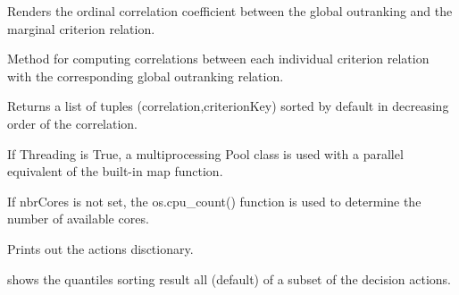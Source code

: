\documentclass[letterpaper,10pt,english]{sphinxmanual}
\begin{document}
\begin{fulllineitems}
\begin{fulllineitems}
\label{techDoc:bigOutrankingDigraphs.BigOutrankingDigraph.computeCriterion2RankingCorrelation}
Renders the ordinal correlation coefficient between
the global outranking and the marginal criterion relation.

\end{fulllineitems}


\begin{fulllineitems}
\label{techDoc:bigOutrankingDigraphs.BigOutrankingDigraph.computeMarginalVersusGlobalOutrankingCorrelations}
Method for computing correlations between each individual criterion relation with the corresponding
global outranking relation.

Returns a list of tuples (correlation,criterionKey) sorted by default in decreasing order of the correlation.

If Threading is True, a multiprocessing Pool class is used with a parallel equivalent of the built-in map function.

If nbrCores is not set, the os.cpu\_count() function is used to determine the number of
available cores.

\end{fulllineitems}


\begin{fulllineitems}
\label{techDoc:bigOutrankingDigraphs.BigOutrankingDigraph.showActions}
Prints out the actions disctionary.

\end{fulllineitems}


\begin{fulllineitems}
\label{techDoc:bigOutrankingDigraphs.BigOutrankingDigraph.showActionsSortingResult}
shows the quantiles sorting result all (default) of a subset of the decision actions.


\end{fulllineitems}
\end{fulllineitems}
\end{document}
